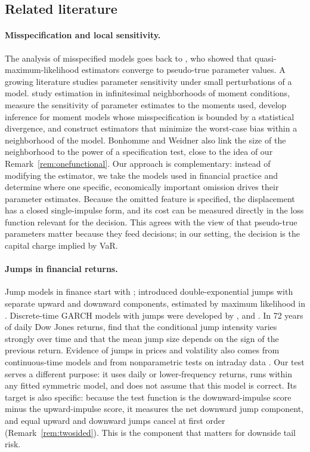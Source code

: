 \documentclass[11pt,a4paper]{article}
\theoremstyle{definition}
\theoremstyle{remark}
\begin{document}
\subsection{Related literature}\label{sec:lit}

\paragraph{Misspecification and local sensitivity.} The analysis of misspecified models goes back to \citet{white1982}, who showed that quasi-maximum-likelihood estimators converge to pseudo-true parameter values. A growing literature studies parameter sensitivity under small perturbations of a model. \citet{kitamura2013} study estimation in infinitesimal neighborhoods of moment conditions, \citet{andrews2017} measure the sensitivity of parameter estimates to the moments used, \citet{chen2024} develop inference for moment models whose misspecification is bounded by a statistical divergence, and \citet{bonhomme2022} construct estimators that minimize the worst-case bias within a neighborhood of the model. Bonhomme and Weidner also link the size of the neighborhood to the power of a specification test, close to the idea of our Remark~\ref{rem:onefunctional}. Our approach is complementary: instead of modifying the estimator, we take the models used in financial practice and determine where one specific, economically important omission drives their parameter estimates. Because the omitted feature is specified, the displacement has a closed single-impulse form, and its cost can be measured directly in the loss function relevant for the decision. This agrees with the view of \citet{andrews2026} that pseudo-true parameters matter because they feed decisions; in our setting, the decision is the capital charge implied by VaR.

\paragraph{Jumps in financial returns.} Jump models in finance start with \citet{merton1976}; \citet{kou2002} introduced double-exponential jumps with separate upward and downward components, estimated by maximum likelihood in \citet{ramezani2007}. Discrete-time GARCH models with jumps were developed by \citet{chan2002}, \citet{maheu2004} and \citet{duan2006}. In 72 years of daily Dow Jones returns, \citet{chan2002} find that the conditional jump intensity varies strongly over time and that the mean jump size depends on the sign of the previous return. Evidence of jumps in prices and volatility also comes from continuous-time models \citep{eraker2003} and from nonparametric tests on intraday data \citep{bns2006,leemykland2008}. Our test serves a different purpose: it uses daily or lower-frequency returns, runs within any fitted symmetric model, and does not assume that this model is correct. Its target is also specific: because the test function is the downward-impulse score minus the upward-impulse score, it measures the net downward jump component, and equal upward and downward jumps cancel at first order (Remark~\ref{rem:twosided}). This is the component that matters for downside tail risk.
\end{document}
